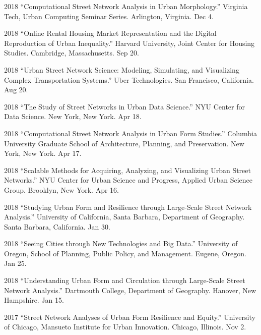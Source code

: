 \documentclass[12pt,letterpaper]{report}
\begin{document}
\begin{tablist}

\item[2018] \tab \enquote{Computational Street Network Analysis in Urban Morphology.} Virginia Tech, Urban Computing Seminar Series. Arlington, Virginia. Dec 4.	

\item[2018] \tab \enquote{Online Rental Housing Market Representation and the Digital Reproduction of Urban Inequality.} Harvard University, Joint Center for Housing Studies. Cambridge, Massachusetts. Sep 20.

\item[2018] \tab \enquote{Urban Street Network Science: Modeling, Simulating, and Visualizing Complex Transportation Systems.} Uber Technologies. San Francisco, California. Aug 20.

\item[2018] \tab \enquote{The Study of Street Networks in Urban Data Science.} NYU Center for Data Science. New York, New York. Apr 18.

\item[2018] \tab \enquote{Computational Street Network Analysis in Urban Form Studies.} Columbia University Graduate School of Architecture, Planning, and Preservation. New York, New York. Apr 17.

\item[2018] \tab \enquote{Scalable Methods for Acquiring, Analyzing, and Visualizing Urban Street Networks.} NYU Center for Urban Science and Progress, Applied Urban Science Group. Brooklyn, New York. Apr 16.

\item[2018] \tab \enquote{Studying Urban Form and Resilience through Large-Scale Street Network Analysis.} University of California, Santa Barbara, Department of Geography. Santa Barbara, California. Jan 30.

\item[2018] \tab \enquote{Seeing Cities through New Technologies and Big Data.} University of Oregon, School of Planning, Public Policy, and Management. Eugene, Oregon. Jan 25.

\item[2018] \tab \enquote{Understanding Urban Form and Circulation through Large-Scale Street Network Analysis.} Dartmouth College, Department of Geography. Hanover, New Hampshire. Jan 15.

\item[2017] \tab \enquote{Street Network Analyses of Urban Form Resilience and Equity.} University of Chicago, Mansueto Institute for Urban Innovation. Chicago, Illinois. Nov 2.


\end{tablist}
\end{document}
